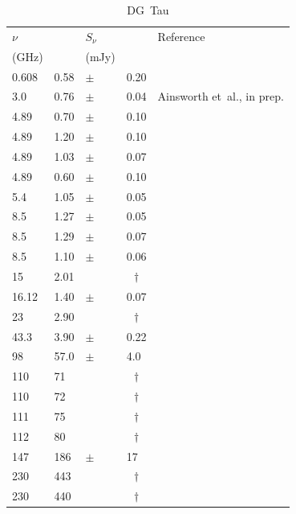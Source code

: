 \documentclass[9pt]{extarticle}   	%
\def\multic#1#2{\multicolumn{#1}{c}{#2}}
\def\dagmark{\multic{1}{$\dag$\qquad}}
\begin{document}
\begin{table}
\caption{DG~Tau}
\begin{center}
\begin{tabular}{lllll}
\hline
 $\nu$ & & $S_\nu$ & & Reference\\
 (GHz) & & (mJy) & & \\
\hline
 0.608  &  0.58 & $\pm$ & 0.20 & \citet{2016MNRAS.459.1248A}\\
 3.0    &  0.76 & $\pm$ & 0.04 & Ainsworth et~al., in prep.\\
 4.89   &  0.70 & $\pm$ & 0.10 & \citet{1982ApJ...253..707C} \\
 4.89   &  1.20 & $\pm$ & 0.10 & \citet{1984ApJ...282..699B} \\
 4.89   &  1.03 & $\pm$ & 0.07 & \citet{1986AJ.....92.1396C} \\
 4.89   &  0.60 & $\pm$ & 0.10 & \citet{1987ApJ...320..364E} \\
 5.4    &  1.05 & $\pm$ & 0.05 & \citet{2013ApJ...766...53L} \\
 8.5    &  1.27 & $\pm$ & 0.05 & \citet{2012AA...537A.123R} \\
 8.5    &  1.29 & $\pm$ & 0.07 & \citet{2013ApJ...766...53L} \\
 8.5    &  1.10 & $\pm$ & 0.06 & \citet{2013ApJ...766...53L} \\
 15     &  2.01 &  & \dagmark  & \citet{1986AJ.....92.1396C} \\
 16.12  &  1.40 & $\pm$ & 0.07 & \citet{2012MNRAS.420.3334S} \\
 23     &  2.90 &  & \dagmark  & \citet{1982AA...107..368B} \\
 43.3   &  3.90 & $\pm$ & 0.22 & \citet{2013ApJ...766...53L} \\
 98     &  57.0 & $\pm$ & 4.0  & \citet{1991AJ....102.2054O} \\
 110    &  71 &  & \dagmark    & \citet{1989LNP...350..215S} \\
 110    &  72 &  & \dagmark    & \citet{1996ApJ...457..277K} \\
 111    &  75 &  & \dagmark    & \citet{1994ASPC...59..203S} \\
 112    &  80 &  & \dagmark    & \citet{1989ApJ...337L..41W} \\
 147    &  186 & $\pm$ & 17    & \citet{1996ApJ...465L.137K} \\
 230    &  443 &  & \dagmark   & \citet{1990AJ.....99..924B} \\
 230    &  440 &  & \dagmark   & \citet{1990ApJ...357..606A} \\

\end{tabular}
\end{center}
\end{table}
\end{document}
